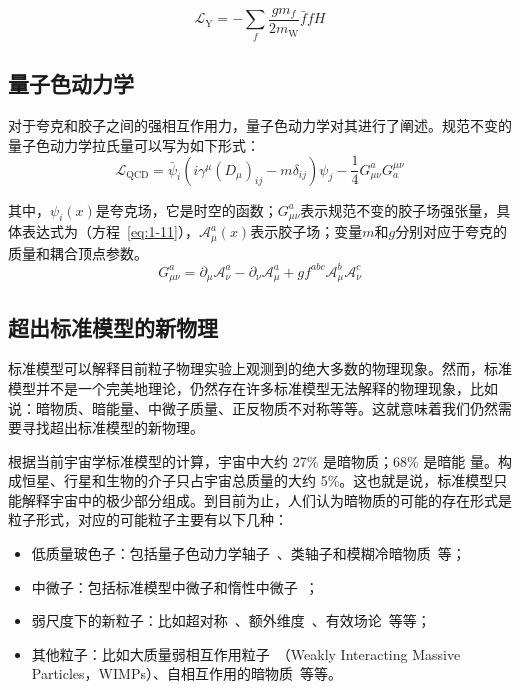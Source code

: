 \begin{equation}\label{eq:1-9}
    \mathcal{L}_{\mathrm{Y}}=-\sum_{f} \frac{g m_{f}}{2 m_{\mathrm{W}}} \bar{f} f H
\end{equation}

\subsection{量子色动力学}

对于夸克和胶子之间的强相互作用力，量子色动力学对其进行了阐述。规范不变的量子色动力学拉氏量可以写为如下形式：
\begin{equation}\label{eq:1-10}
    \mathcal{L}_{\mathrm{QCD}}=\bar{\psi}_{i}\left(i \gamma^{\mu}\left(D_{\mu}\right)_{i j}-m \delta_{i j}\right) \psi_{j}-\frac{1}{4} G_{\mu \nu}^{a} G_{a}^{\mu \nu}
\end{equation}

其中，$\psi_{i}(x)$是夸克场，它是时空的函数；$G_{\mu \nu}^{a}$表示规范不变的胶子场强张量，具体表达式为（方程~\eqref{eq:1-11}），$\mathcal{A}_{\mu}^{a}(x)$表示胶子场；变量$m$和$g$分别对应于夸克的质量和耦合顶点参数。
\begin{equation}\label{eq:1-11}
    G_{\mu \nu}^{a}=\partial_{\mu} \mathcal{A}_{\nu}^{a}-\partial_{\nu} \mathcal{A}_{\mu}^{a}+g f^{a b c} \mathcal{A}_{\mu}^{b} \mathcal{A}_{\nu}^{c}
\end{equation}

\subsection{超出标准模型的新物理}

标准模型可以解释目前粒子物理实验上观测到的绝大多数的物理现象。然而，标准模型并不是一个完美地理论，仍然存在许多标准模型无法解释的物理现象，比如说：暗物质、暗能量、中微子质量、正反物质不对称等等。这就意味着我们仍然需要寻找超出标准模型的新物理。

根据当前宇宙学标准模型的计算，宇宙中大约 27\% 是暗物质；68\% 是暗能
量。构成恒星、行星和生物的介子只占宇宙总质量的大约 5\%。这也就是说，标准模型只能解释宇宙中的极少部分组成。到目前为止，人们认为暗物质的可能的存在形式是粒子形式，对应的可能粒子主要有以下几种：
\begin{itemize}
    \item 低质量玻色子：包括量子色动力学轴子~\cite{Bandyopadhyay_2019}、类轴子和模糊冷暗物质~\cite{PhysRevLett.85.1158}等；
    \item 中微子：包括标准模型中微子和惰性中微子~\cite{Boyarsky_2019}；
    \item 弱尺度下的新粒子：比如超对称~\cite{1966PThPh..36.1266M}、额外维度~\cite{rizzo2004pedagogical}、有效场论~\cite{Criado_2021}等等；
    \item 其他粒子：比如大质量弱相互作用粒子~\cite{Jungman_1996}（Weakly Interacting Massive Particles，WIMPs）、自相互作用的暗物质~\cite{PhysRevLett.84.3760}等等。
\end{itemize}

